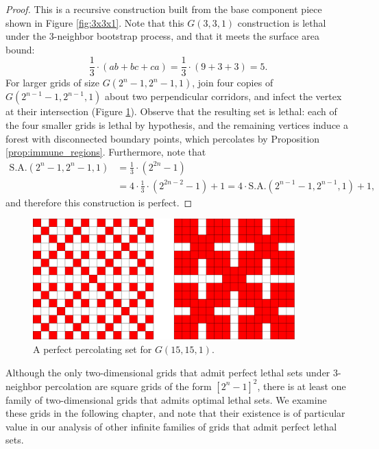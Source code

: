 \begin{proof}
This is a recursive construction built from the base component piece shown in Figure \ref{fig:3x3x1}. Note that this $G(3,3,1)$ construction is lethal under the 3-neighbor bootstrap process, and that it meets the surface area bound:
$$\frac{1}{3} \cdot (ab+bc+ca) = \frac{1}{3} \cdot (9 + 3 + 3) = 5.$$
For larger grids of size $G(2^n-1, 2^n-1, 1)$, join four copies of $G(2^{n-1}-1, 2^{n-1}, 1)$ about two perpendicular corridors, and infect the vertex at their intersection (Figure \ref{fig:15x15x1}). Observe that the resulting set is lethal: each of the four smaller grids is lethal by hypothesis, and the remaining vertices induce a forest with disconnected boundary points, which percolates by Proposition \ref{prop:immune_regions}. Furthermore, note that
\begin{align*}
\text{S.A.}(2^n-1,2^n-1,1) &= \frac{1}{3} \cdot (2^{2n}-1) \\
&= 4 \cdot \frac{1}{3} \cdot (2^{2n-2} -1) + 1 = 4 \cdot \text{S.A.}(2^{n-1}-1, 2^{n-1}, 1) + 1,
\end{align*}
and therefore this construction is perfect.
\end{proof}

\begin{figure}[]
\centering
\includegraphics[width=0.9\textwidth]{figures/7/15x15x1.pdf}
\caption{A perfect percolating set for $G(15,15,1)$.}
\label{fig:15x15x1}
\end{figure} 

Although the only two-dimensional grids that admit perfect lethal sets under 3-neighbor percolation are square grids of the form $[2^n-1]^2$, there is at least one family of two-dimensional grids that admits optimal lethal sets. We examine these grids in the following chapter, and note that their existence is of particular value in our analysis of other infinite families of grids that admit perfect lethal sets. 

